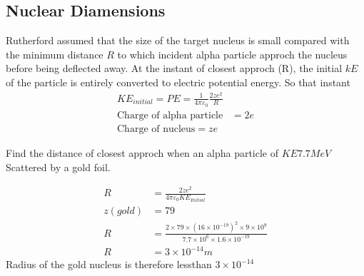 \subsection{Nuclear Diamensions}
Rutherford assumed that the size of the target nucleus is small compared with the minimum distance $R$ to which incident alpha particle approch the nucleus before being deflected away. At the instant of closest approch (R), the initial $kE$ of the particle is entirely converted to electric potential energy. So that instant\\
\begin{align*}
KE_{initial}=PE=\frac{1}{4\pi\varepsilon_0}\frac{2ze^2}{R}\\
\text{Charge of alpha particle}&=2e\\
\text{Charge of nucleus}=ze
\end{align*}
\begin{center}
\end{center}
\begin{exercise}
	 Find the distance of closest approch when an alpha particle of $KE7.7 MeV$Scattered by a gold foil.
\end{exercise}
\begin{answer}
\begin{align*}
R&=\frac{2ze^2}{4\pi\varepsilon_0KE_{Initial}}\\
z(gold)&=79\\
R&=\frac{2\times79\times(16\times10^{-19})^2\times9\times10^9}{7.7\times10^6\times1.6\times10^{-19}}\\
R&=3\times10^{-14}m
\end{align*}
Radius of the gold nucleus is therefore lessthan $3\times10^{-14}$	
\end{answer}
